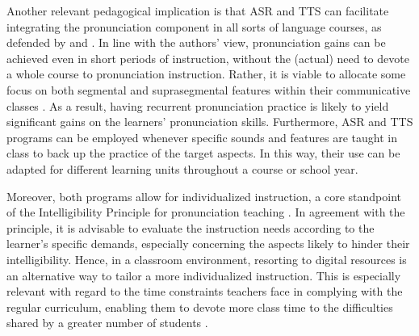 \documentclass[english]{textolivre}
\begin{document}
Another relevant pedagogical implication is that ASR and TTS can facilitate integrating the pronunciation component in all sorts of language courses, as defended by \textcite{darcy_window_2021} and \textcite{gordon_development_2016}. In line with the authors’ view, pronunciation gains can be achieved even in short periods of instruction, without the (actual) need to devote a whole course to pronunciation instruction. Rather, it is viable to allocate some focus on both segmental and suprasegmental features within their communicative classes \cite{darcy_window_2021}. As a result, having recurrent pronunciation practice is likely to yield significant gains on the learners’ pronunciation skills. Furthermore, ASR and TTS programs can be employed whenever specific sounds and features are taught in class to back up the practice of the target aspects. In this way, their use can be adapted for different learning units throughout a course or school year.

Moreover, both programs allow for individualized instruction, a core standpoint of the Intelligibility Principle for pronunciation teaching \cite{thomson_effectiveness_2014, munro_2015}. In agreement with the principle, it is advisable to evaluate the instruction needs according to the learner's specific demands, especially concerning the aspects likely to hinder their intelligibility. Hence, in a classroom environment, resorting to digital resources is an alternative way to tailor a more individualized instruction. This is especially relevant with regard to the time constraints teachers face in complying with the regular curriculum, enabling them to devote more class time to the difficulties shared by a greater number of students \cite{roccamo_effective_2014, munro_2015}.
\end{document}
